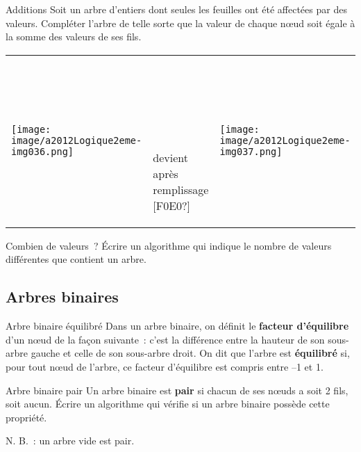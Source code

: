 		\begin{Exercice}{Additions}
			Soit un arbre d'entiers dont seules les feuilles ont été 
			affectées par des valeurs. Compléter l'arbre de telle sorte que
			la valeur de chaque n{\oe}ud soit égale à la somme des valeurs de ses fils.

			\begin{flushleft}
			\tablefirsthead{}
			\tablehead{}
			\tabletail{}
			\tablelasttail{}
			\begin{supertabular}{m{5.215cm}m{5.217cm}m{5.217cm}}
			 \texttt{[image: image/a2012Logique2eme-img036.png]}  &
			~

			~

			~

			{ devient après remplissage [F0E0?]} &
			 \texttt{[image: image/a2012Logique2eme-img037.png]} \\
			\end{supertabular}
			\end{flushleft}

		\end{Exercice}
		
		\begin{Exercice}{Combien de valeurs~?}
			Écrire un algorithme qui indique le nombre de valeurs différentes 
			que contient un arbre.
		\end{Exercice}
		
	\subsection{Arbres binaires}

		\begin{Exercice}{Arbre binaire équilibré}
			Dans un arbre binaire, on définit le \textbf{facteur d'équilibre} 
			d'un n{\oe}ud de la façon suivante~: c'est la différence entre 
			la hauteur de son sous-arbre gauche et celle de son sous-arbre droit. 
			On dit que l'arbre est \textbf{équilibré} si, pour tout n{\oe}ud 
			de l'arbre, ce facteur d'équilibre est compris entre --1 et 1.
		\end{Exercice}
		
		\begin{Exercice}{Arbre binaire pair}
			Un arbre binaire est \textbf{pair} si chacun de ses n{\oe}uds 
			a soit 2 fils, soit aucun. Écrire un algorithme qui
			vérifie si un arbre binaire possède cette propriété. 
			
			N. B.~: un arbre vide est pair.
		\end{Exercice}
		
